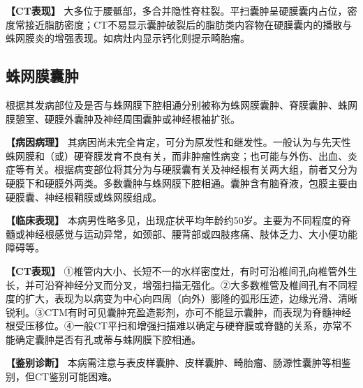 \textbf{【CT表现】}
大多位于腰骶部，多合并隐性脊柱裂。平扫囊肿呈硬膜囊内占位，密度常接近脂肪密度；CT不易显示囊肿破裂后的脂肪类内容物在硬膜囊内的播散与蛛网膜炎的增强表现。如病灶内显示钙化则提示畸胎瘤。

\subsection{蛛网膜囊肿}

根据其发病部位及是否与蛛网膜下腔相通分别被称为蛛网膜囊肿、脊膜囊肿、蛛网膜憩室、硬膜外囊肿及神经周围囊肿或神经根袖扩张。

\textbf{【病因病理】}
其病因尚未完全肯定，可分为原发性和继发性。一般认为与先天性蛛网膜和（或）硬脊膜发育不良有关，而非肿瘤性病变；也可能与外伤、出血、炎症等有关。根据病变部位将其分为与硬膜囊有关及神经根有关两大组，前者又分为硬膜下和硬膜外两类。多数囊肿与蛛网膜下腔相通。囊肿含有脑脊液，包膜主要由硬膜囊、神经根鞘膜或蛛网膜组成。

\textbf{【临床表现】}
本病男性略多见，出现症状平均年龄约50岁。主要为不同程度的脊髓或神经根感觉与运动异常，如颈部、腰背部或四肢疼痛、肢体乏力、大小便功能障碍等。

\textbf{【CT表现】}
①椎管内大小、长短不一的水样密度灶，有时可沿椎间孔向椎管外生长，并可沿脊神经分叉而分叉，增强扫描无强化。②大多数椎管及椎间孔有不同程度的扩大，表现为以病变为中心向四周（向外）膨隆的弧形压迹，边缘光滑、清晰锐利。③CTM有时可见囊肿充盈造影剂，亦可不能显示囊肿，而表现为脊髓神经根受压移位。④一般CT平扫和增强扫描难以确定与硬脊膜或脊髓的关系，亦常不能确定囊肿是否有孔或蒂与蛛网膜下腔相通。

\textbf{【鉴别诊断】}
本病需注意与表皮样囊肿、皮样囊肿、畸胎瘤、肠源性囊肿等相鉴别，但CT鉴别可能困难。

\protect\hypertarget{text00031.html}{}{}

